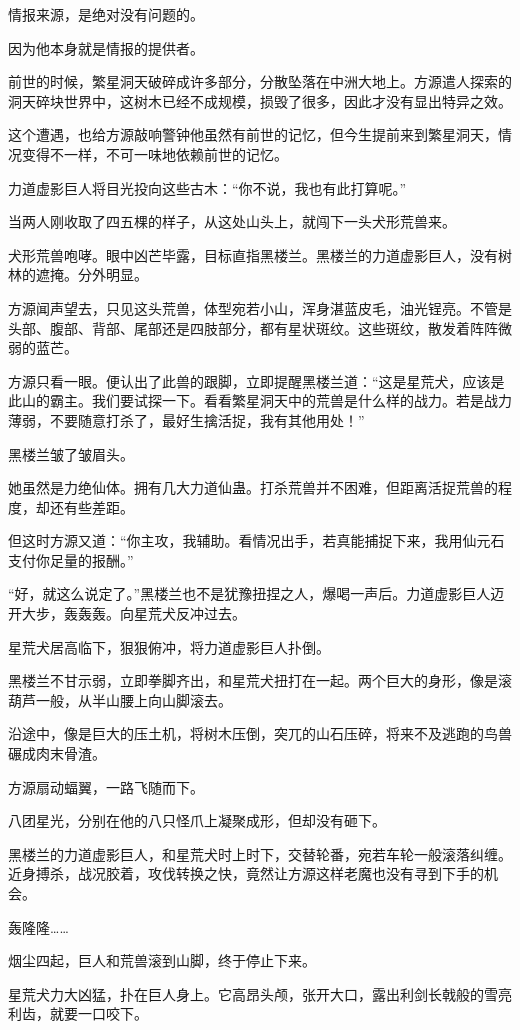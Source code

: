 \begin{this_body}
情报来源，是绝对没有问题的。

因为他本身就是情报的提供者。

前世的时候，繁星洞天破碎成许多部分，分散坠落在中洲大地上。方源遣人探索的洞天碎块世界中，这树木已经不成规模，损毁了很多，因此才没有显出特异之效。

这个遭遇，也给方源敲响警钟他虽然有前世的记忆，但今生提前来到繁星洞天，情况变得不一样，不可一味地依赖前世的记忆。

力道虚影巨人将目光投向这些古木：“你不说，我也有此打算呢。”

当两人刚收取了四五棵的样子，从这处山头上，就闯下一头犬形荒兽来。

犬形荒兽咆哮。眼中凶芒毕露，目标直指黑楼兰。黑楼兰的力道虚影巨人，没有树林的遮掩。分外明显。

方源闻声望去，只见这头荒兽，体型宛若小山，浑身湛蓝皮毛，油光锃亮。不管是头部、腹部、背部、尾部还是四肢部分，都有星状斑纹。这些斑纹，散发着阵阵微弱的蓝芒。

方源只看一眼。便认出了此兽的跟脚，立即提醒黑楼兰道：“这是星荒犬，应该是此山的霸主。我们要试探一下。看看繁星洞天中的荒兽是什么样的战力。若是战力薄弱，不要随意打杀了，最好生擒活捉，我有其他用处！”

黑楼兰皱了皱眉头。

她虽然是力绝仙体。拥有几大力道仙蛊。打杀荒兽并不困难，但距离活捉荒兽的程度，却还有些差距。

但这时方源又道：“你主攻，我辅助。看情况出手，若真能捕捉下来，我用仙元石支付你足量的报酬。”

“好，就这么说定了。”黑楼兰也不是犹豫扭捏之人，爆喝一声后。力道虚影巨人迈开大步，轰轰轰。向星荒犬反冲过去。

星荒犬居高临下，狠狠俯冲，将力道虚影巨人扑倒。

黑楼兰不甘示弱，立即拳脚齐出，和星荒犬扭打在一起。两个巨大的身形，像是滚葫芦一般，从半山腰上向山脚滚去。

沿途中，像是巨大的压土机，将树木压倒，突兀的山石压碎，将来不及逃跑的鸟兽碾成肉末骨渣。

方源扇动蝠翼，一路飞随而下。

八团星光，分别在他的八只怪爪上凝聚成形，但却没有砸下。

黑楼兰的力道虚影巨人，和星荒犬时上时下，交替轮番，宛若车轮一般滚落纠缠。近身搏杀，战况胶着，攻伐转换之快，竟然让方源这样老魔也没有寻到下手的机会。

轰隆隆……

烟尘四起，巨人和荒兽滚到山脚，终于停止下来。

星荒犬力大凶猛，扑在巨人身上。它高昂头颅，张开大口，露出利剑长戟般的雪亮利齿，就要一口咬下。


\end{this_body}
